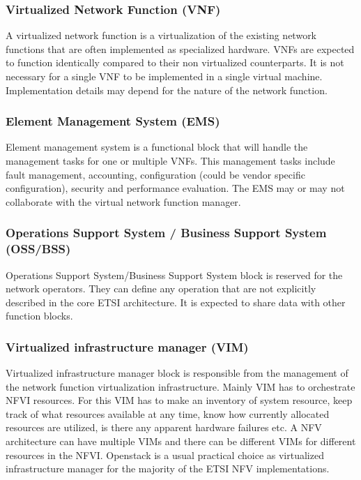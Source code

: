 \documentclass[12pt,oneandhalf,chaparabic,ceng,ms,eng,oneside,pntc]{gsufbe}
\begin{document}
\subsubsection{Virtualized Network Function (VNF)}
A virtualized network function is a virtualization of the existing network functions that are often
implemented as specialized hardware. VNFs are expected to function identically compared to their non 
virtualized counterparts. It is not necessary for a single VNF to be implemented in a single virtual
machine. Implementation details may depend for the nature of the network function.

\subsubsection{Element Management System (EMS)}
Element management system is a functional block that will handle the management tasks for one or
multiple VNFs. This management tasks include fault management, accounting, configuration (could be 
vendor specific configuration), security and performance evaluation. The EMS may or may not collaborate
with the virtual network function manager.

\subsubsection{Operations Support System / Business Support System (OSS/BSS)}
Operations Support System/Business Support System block is reserved for the network
operators. They can define any operation that are not explicitly described in the core
ETSI architecture. It is expected to share data with other function blocks.

\subsubsection{Virtualized infrastructure manager (VIM)}
Virtualized infrastructure manager block is responsible from the management of the network function
virtualization infrastructure. Mainly VIM has to orchestrate NFVI resources. For this VIM has to make
an inventory of system resource, keep track of what resources available at any time, know how currently
allocated resources are utilized, is there any apparent hardware failures etc.
A NFV architecture can have multiple VIMs and there can be different VIMs for different resources in 
the NFVI. Openstack is a usual practical choice as virtualized infrastructure manager for the majority
of the ETSI NFV implementations.
\end{document}
